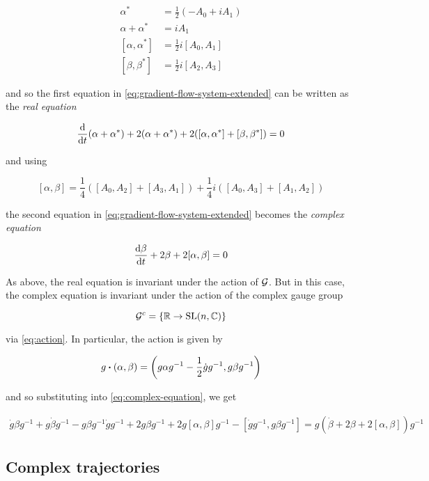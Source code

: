 \documentclass{report}
\begin{document}
\begin{align*}
    \alpha^* &= \frac{1}{2}(-A_0 + iA_1) \\
    \alpha + \alpha^* &= iA_1 \\
    [\alpha, \alpha^*] &= \frac12i[A_0, A_1] \\
    [\beta, \beta^*] &= \frac12i[A_2, A_3]
\end{align*}

and so the first equation in \cref{eq:gradient-flow-system-extended} can be written as the \emph{real equation}

\begin{equation}
    \label{eq:real-equation}
    \dv{t}(\alpha + \alpha^*) + 2(\alpha + \alpha^*) + 2([\alpha, \alpha^*] + [\beta, \beta^*]) = 0
\end{equation}

and using

\[[\alpha, \beta] = \frac14\left([A_0, A_2] + [A_3, A_1]\right) + \frac14i\left([A_0, A_3] + [A_1, A_2]\right)\]

the second equation in \cref{eq:gradient-flow-system-extended} becomes the \emph{complex equation}

\begin{equation}
    \label{eq:complex-equation}
    \dv{\beta}{t} + 2\beta + 2[\alpha, \beta] = 0
\end{equation}

As above, the real equation is invariant under the action of \(\mathcal{G}\). But in this case, the complex equation is invariant under the action of the complex gauge group

\[\mathcal{G}^c = \left\{\mathbb{R} \to \operatorname{SL}(n, \mathbb{C})\right\}\]

via \cref{eq:action}. In particular, the action is given by

\[g \vdot (\alpha, \beta) = \left(g\alpha g^{-1} - \frac{1}{2}\dot g g^{-1}, g\beta g^{-1}\right)\]

and so substituting into \cref{eq:complex-equation}, we get

\begin{align*}
    \dot g \beta g^{-1} + g\dot\beta g^{-1} - g\beta g^{-1}\dot g g^{-1} + 2 g\beta g^{-1} + 2 g[\alpha, \beta]g^{-1} - [\dot g g^{-1}, g\beta g^{-1}] = g\left(\dot\beta + 2\beta + 2[\alpha,\beta]\right)g^{-1}
\end{align*}

\subsection{Complex trajectories}
\end{document}
